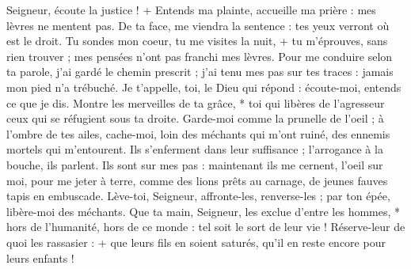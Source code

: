 Seigneur, écoute la justice ! + Entends ma plainte, accueille ma prière : mes lèvres ne mentent pas.
\versseparator
De ta face, me viendra la sentence : tes yeux verront où est le droit.
\versseparator
Tu sondes mon coeur, tu me visites la nuit, + tu m'éprouves, sans rien trouver ; mes pensées n'ont pas franchi mes lèvres.
\versseparator
Pour me conduire selon ta parole, j'ai gardé le chemin prescrit ;
\versseparator
j'ai tenu mes pas sur tes traces : jamais mon pied n'a trébuché.
\versseparator
Je t'appelle, toi, le Dieu qui répond : écoute-moi, entends ce que je dis.
\versseparator
Montre les merveilles de ta grâce, * toi qui libères de l'agresseur ceux qui se réfugient sous ta droite.
\versseparator
Garde-moi comme la prunelle de l'oeil ; à l'ombre de tes ailes, cache-moi,
\versseparator
loin des méchants qui m'ont ruiné, des ennemis mortels qui m'entourent.
\versseparator
Ils s'enferment dans leur suffisance ; l'arrogance à la bouche, ils parlent.
\versseparator
Ils sont sur mes pas : maintenant ils me cernent, l'oeil sur moi, pour me jeter à terre,
\versseparator
comme des lions prêts au carnage, de jeunes fauves tapis en embuscade.
\versseparator
Lève-toi, Seigneur, affronte-les, renverse-les ; par ton épée, libère-moi des méchants.
\versseparator
Que ta main, Seigneur, les exclue d'entre les hommes, * hors de l'humanité, hors de ce monde : tel soit le sort de leur vie ! Réserve-leur de quoi les rassasier : + que leurs fils en soient saturés, qu'il en reste encore pour leurs enfants !
